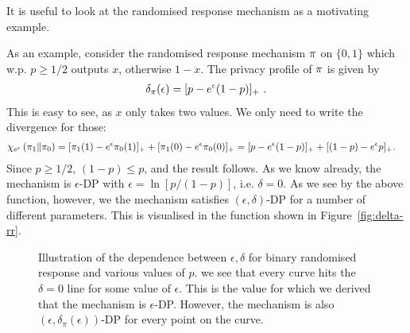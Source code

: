 {  It is useful to look at the randomised response mechanism as a motivating example. 
  \begin{example}
  As an example, consider the randomised response mechanism $\pi$ on $\{0,1\}$ which w.p. $p \geq 1/2$ outputs $x$, otherwise $1 - x$. The privacy profile of $\pi$ is given by
  \begin{align}
    \delta_\pi(\epsilon) = [p - e^\epsilon(1 - p)]_+ ~.
    \label{eq:privacy-profile-rr}
  \end{align}
  This is easy to see,  as $x$ only takes two values. We only need to write the divergence for those:
  \begin{align*}
    \chi_{e^\epsilon}\left(\pi_1 \middle\| \pi_0 \right)
    &=
      [\pi_1(1) - e^\epsilon \pi_0(1)]_+ + [\pi_1(0) - e^\epsilon \pi_0(0)]_+
    =
      [p - e^\epsilon (1 - p)]_+ + [(1 - p) - e^\epsilon p]_+.
  \end{align*}
  Since $p \geq 1/2$, $(1 -p) \leq p$, and the result follows. As we know already, the mechanism is $\epsilon$-DP with $\epsilon = \ln[p/(1-p)]$, i.e. $\delta = 0$. As we see by the above function, however, we the mechanism satisfies $(\epsilon, \delta)$-DP for a number of different parameters. This is visualised in the function shown in Figure~\ref{fig:delta-rr}.
  \begin{figure}[h]
    \centering
    \caption{Illustration of the dependence between $\epsilon, \delta$ for binary randomised response and various values of $p$. we see that every curve hits the $\delta = 0$ line for some value of $\epsilon$. This is the value for which we derived that the mechanism is $\epsilon$-DP. However, the mechanism is also $(\epsilon, \delta_\pi(\epsilon))$-DP for every point on the curve.}

\end{figure}
\end{example}}
